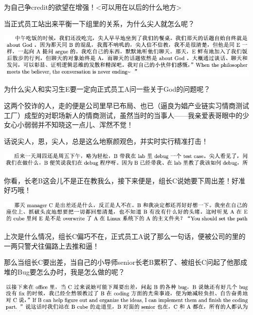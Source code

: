 \documentclass[9pt, b5paper]{article}
\begin{document}
为自己争credit的欲望在增强！<可以用在以后的什么地方>

当正式员工站出来平衡一下组里的关系，为什么尖人就怎么呢？

\begin{center}
\includegraphics[width=.9\linewidth]{./pic/backups_plans_20210507_103521.png}
\end{center}

为什么尖人和实习生E要一定向正式员工A问一些关于God的问题呢？

这两个狡诈的人，走的便是公司里早已布局、也已（逼良为娼产业链实习情商测试工厂）成型的对职场新人的情商测试，虽然当时的当事人——我亲爱表哥眼中的少女心小弱弱并不知晓这一点儿、浑然不觉！

话说尖人，恩，尖人，总是这么地察颜观色，并实时实行精准打击！

\begin{center}
\includegraphics[width=.9\linewidth]{./pic/backups_plans_20210507_105925.png}
\end{center}

你看，长老B这会儿不是正在教我么，接下来便是，组长C说她要下周出差！好准好巧哦！

\begin{center}
\includegraphics[width=.9\linewidth]{./pic/backups_plans_20210507_110205.png}
\end{center}

上次是什么情况，组长C偏巧不在，正式员工A说了那么一句话，便被公司的里的一两只警犬往偏路上去推和逼！

那么当组长C要出差，当自己的小导师senior长老B累积了、被组长C问起了他那成堆的Bug要怎么办时，我是怎么做的呢？

\begin{center}
\includegraphics[width=.9\linewidth]{./pic/backups_plans_20210507_110401.png}
\end{center}
\end{document}
